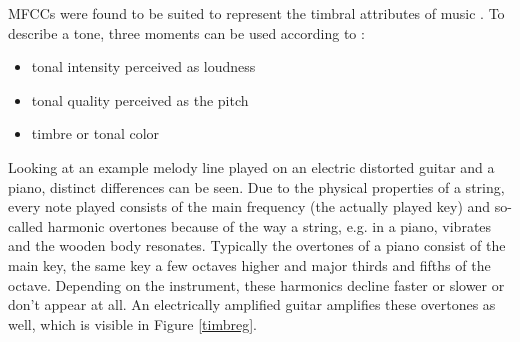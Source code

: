 \FloatBarrier
\noindent MFCCs were found to be suited to represent the timbral attributes of music \cite[p. 55 ff]{knees1}. To describe a tone, three moments can be used according to \cite[pp. 15]{musicdata}: %
\begin{itemize}
	\setlength\itemsep{-0.5em}
	\item tonal intensity perceived as loudness
	\item tonal quality perceived as the pitch 
	\item timbre or tonal color
\end{itemize}
\noindent Looking at an example melody line played on an electric distorted guitar and a piano, distinct differences can be seen. Due to the physical properties of a string, every note played consists of the main frequency (the actually played key) and so-called harmonic overtones because of the way a string, e.g. in a piano, vibrates and the wooden body resonates. Typically the overtones of a piano consist of the main key, the same key a few octaves higher and major thirds and fifths of the octave. Depending on the instrument, these harmonics decline faster or slower or don't appear at all. An electrically amplified guitar amplifies these overtones as well, which is visible in Figure \ref{timbreg}.
